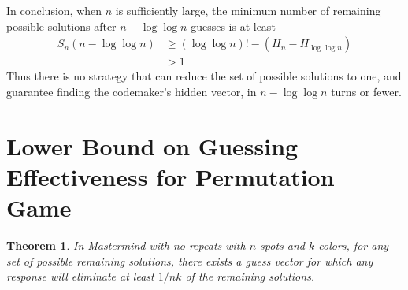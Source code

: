 \documentclass[12pt, a4paper]{article}
\newtheorem{theorem}{Theorem}
\begin{document}
 	In conclusion, when $n$ is sufficiently large, the minimum number of remaining
	possible solutions after $n - \log\log n$ guesses is at least
		\begin{align*}
		S_n(n-\log\log n) & \ge (\log\log n)! - (H_n - H_{\log\log n})\\
		& > 1
		\end{align*}
	Thus there is no strategy that can reduce the set of possible solutions to
	one, and guarantee finding the codemaker's hidden vector, in $n-\log\log n$
	turns or fewer.

\clearpage
\section*{Lower Bound on Guessing Effectiveness for Permutation Game}

	\begin{theorem} In Mastermind with no repeats with $n$ spots and $k$ colors,
	for any set of possible remaining solutions, there exists a
	guess vector for which any response will eliminate at least $1/nk$ of the
	remaining solutions.
	\end{theorem}
\end{document}
